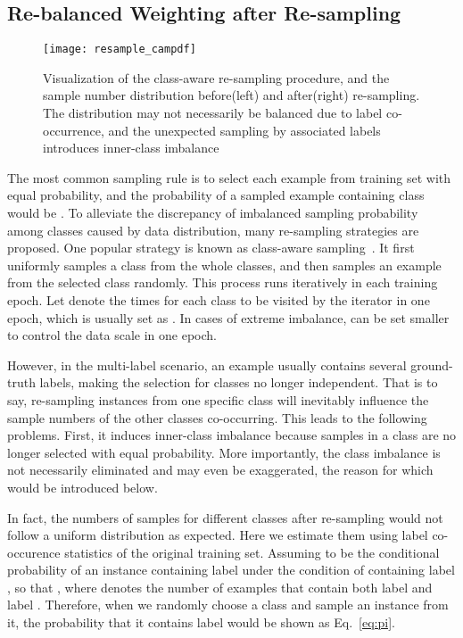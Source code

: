 \documentclass[runningheads]{llncs}
\begin{document}
\subsection{Re-balanced Weighting after Re-sampling} 
\label{subsec:weight}
 
\begin{figure}[t]
    \centering
    \texttt{[image: resample\_campdf]} 
    \caption{
        Visualization of the class-aware re-sampling procedure, and the sample number distribution before(left) and after(right) re-sampling. The distribution may not necessarily be balanced due to label co-occurrence, and the unexpected sampling by associated labels introduces inner-class imbalance
    }
    \label{fig:sampling}
\end{figure}

The most common sampling rule is to select each example from training set with equal probability, and the probability of a sampled example containing class  would be .
To alleviate the discrepancy of imbalanced sampling probability among classes caused by data distribution, many re-sampling strategies are proposed. One popular strategy is known as class-aware sampling~\cite{shen2016relay,kang2019decoupling,zhou2020BBN}. It first uniformly samples a class from the whole  classes, and then samples an example from the selected class randomly. This process runs iteratively in each training epoch.
Let  denote the times for each class to be visited by the iterator in one epoch, which is usually set as .
In cases of extreme imbalance,  can be set smaller to control the data scale in one epoch.

However, in the multi-label scenario, an example usually contains several ground-truth labels, making the selection for classes no longer independent.
That is to say, re-sampling instances from one specific class will inevitably influence the sample numbers of the other classes co-occurring. This leads to the following problems.
First, it induces inner-class imbalance because samples in a class are no longer selected with equal probability.
More importantly, the class imbalance is not necessarily eliminated and may even be exaggerated, the reason for which would be introduced below.

In fact, the numbers of samples for different classes after re-sampling would not follow a uniform distribution as expected.
Here we estimate them using label co-occurence statistics of the original training set. 
Assuming  to be the conditional probability of an instance containing label  under the condition of containing label , so that , where  denotes the number of examples that contain both label  and label . 
Therefore, when we randomly choose a class and sample an instance from it, the probability that it contains label  would be shown as Eq.~\ref{eq:pi}.
\end{document}
